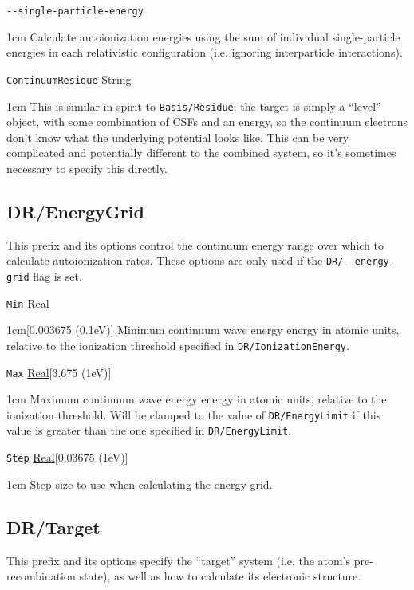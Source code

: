 \documentclass{report}
\begin{document}
\texttt{{-}{-}single-particle-energy}
\begin{adjustwidth}{1cm}{}
Calculate autoionization energies using the sum of individual single-particle energies in each
relativistic configuration (i.e. ignoring interparticle interactions).
\end{adjustwidth}

\texttt{ContinuumResidue} \uline{String}
\begin{adjustwidth}{1cm}{}
This is similar in spirit to \texttt{Basis/Residue}: the target 
is simply a ``level'' object, with some combination of CSFs and an energy, so the continuum electrons 
don't know what the underlying potential looks like. This can be very complicated and potentially 
different to the combined system, so it's sometimes necessary to specify this directly.
\end{adjustwidth}

\subsection{DR/EnergyGrid}
This prefix and its options control the continuum energy range over which to calculate autoionization
rates. These options are only used if the \texttt{DR/{-}{-}energy-grid} flag is set.

\texttt{Min} \uline{Real}
\begin{adjustwidth}{1cm}{}[0.003675 (0.1eV)]
Minimum continuum wave energy energy in atomic units, relative to the ionization threshold specified in
\texttt{DR/IonizationEnergy}.
\end{adjustwidth}

\texttt{Max} \uline{Real}[3.675 (1eV)]
\begin{adjustwidth}{1cm}{}
Maximum continuum wave energy energy in atomic units, relative to the ionization threshold. Will be
clamped to the value of \texttt{DR/EnergyLimit} if this value is greater than the one specified in
\texttt{DR/EnergyLimit}.
\end{adjustwidth}

\texttt{Step} \uline{Real}[0.03675 (1eV)]
\begin{adjustwidth}{1cm}{}
Step size to use when calculating the energy grid.
\end{adjustwidth}

\subsection{DR/Target}
This prefix and its options specify the ``target'' system (i.e. the atom's pre-recombination state), as
well as how to calculate its electronic structure.
\end{document}
